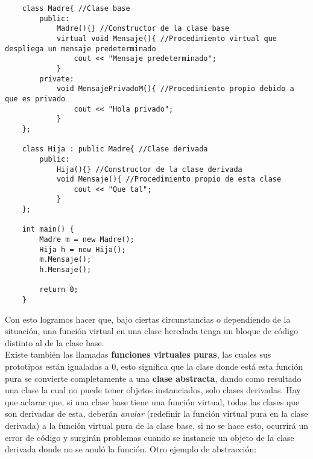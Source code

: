 \begin{lstlisting}
    class Madre{ //Clase base
        public:
            Madre(){} //Constructor de la clase base
            virtual void Mensaje(){ //Procedimiento virtual que despliega un mensaje predeterminado
                cout << "Mensaje predeterminado";
            }
        private:
            void MensajePrivadoM(){ //Procedimiento propio debido a que es privado
                cout << "Hola privado";
            }
    };
    
    class Hija : public Madre{ //Clase derivada
        public:
            Hija(){} //Constructor de la clase derivada
            void Mensaje(){ //Procedimiento propio de esta clase
                cout << "Que tal";
            }
    };
    
    int main() {
        Madre m = new Madre();
        Hija h = new Hija();
        m.Mensaje();
        h.Mensaje();
        
        return 0;
    }
\end{lstlisting}
Con esto logramos hacer que, bajo ciertas circunstancias o dependiendo de la situación, una función virtual en una clase heredada tenga un bloque de código distinto al de la clase base.\\
Existe también las llamadas \textbf{funciones virtuales puras}, las cuales sus prototipos están igualadas a 0, esto significa que la clase donde está esta función pura se convierte completamente a una \textbf{clase abstracta}, dando como resultado una clase la cual no puede tener objetos instanciados, solo clases derivadas. Hay que aclarar que, si una clase base tiene una función virtual, todas las clases que son derivadas de esta, deberán \textit{anular} (redefinir la función virtual pura en la clase derivada) a la función virtual pura de la clase base, si no se hace esto, ocurrirá un error de código y surgirán problemas cuando se instancie un objeto de la clase derivada donde no se anuló la función. Otro ejemplo de abstracción:
